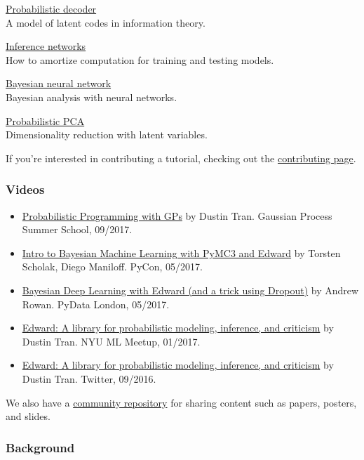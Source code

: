 \href{decoder}{Probabilistic decoder} \\
A model of latent codes in information theory.

\href{inference-networks}{Inference networks} \\
How to amortize computation for training and testing models.

\href{bayesian-neural-network}{Bayesian neural network} \\
Bayesian analysis with neural networks.

\href{probabilistic-pca}{Probabilistic PCA} \\
Dimensionality reduction with latent variables.

If you're interested in contributing a tutorial, checking out the
\href{/contributing}{contributing page}.

\subsubsection{Videos}

\begin{itemize}
  \item
  \href{https://www.youtube.com/watch?list=PLpTp0l_CVmgwyAthrUmmdIFiunV1VvicM&v=1zNNLHyeWok}
  {Probabilistic Programming with GPs}
  by Dustin Tran. Gaussian Process Summer School, 09/2017.
  \item
  \href{https://youtu.be/fR5Wvb86-IU}
  {Intro to Bayesian Machine Learning with PyMC3 and Edward}
  by Torsten Scholak, Diego Maniloff. PyCon, 05/2017.
  \item
  \href{https://www.youtube.com/watch?v=I09QVNrUS3Q}
  {Bayesian Deep Learning with Edward (and a trick using Dropout)}
  by Andrew Rowan. PyData London, 05/2017.
  \item
  \href{http://bit.ly/2k9QM3J}
  {Edward: A library for probabilistic modeling, inference, and
  criticism}
  by Dustin Tran. NYU ML Meetup, 01/2017.
  \item
  \href{https://www.pscp.tv/hugo_larochelle/1yNGanvpOPjJj}
  {Edward: A library for probabilistic modeling, inference, and criticism}
  by Dustin Tran. Twitter, 09/2016.
\end{itemize}

We also have a
\href{https://github.com/edwardlib/papers}{community repository}
for sharing content such as papers, posters, and slides.

\subsubsection{Background}


